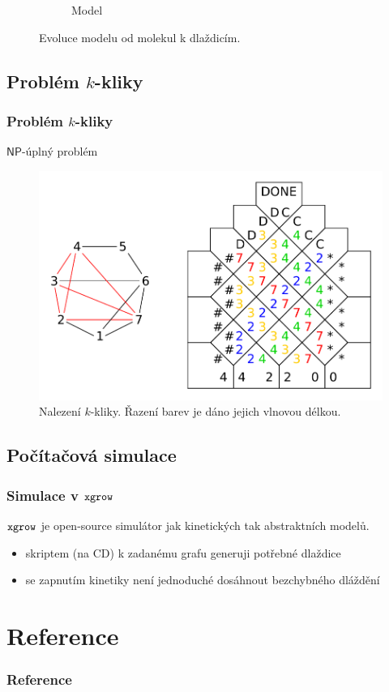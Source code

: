 \documentclass[10pt]{beamer}
\newcommand{\NP}{\mathsf{NP}}
\theoremstyle{definition}
\theoremstyle{remark}
\begin{document}
\begin{frame}
\begin{figure}[H]
\begin{center}
\begin{subfigure}[b]{0.25\textwidth}
			\caption{Model}
		\end{subfigure}
		\caption{Evoluce modelu od molekul k dlaždicím.}
		\label{fig:evolution}
	\end{center}
	\end{figure}
\end{frame}

\subsection{Problém $k$-kliky}
\begin{frame}
\frametitle{Problém $k$-kliky}
	$\NP$-úplný problém
	\begin{figure}[h]
	\begin{center}
		\includegraphics[scale=0.6]{../figures/k-clique/k-clique.pdf}
		\caption{Nalezení $k$-kliky. Řazení barev je dáno jejich vlnovou délkou.}
	\end{center}
	\end{figure}
\end{frame}

\subsection{Počítačová simulace}
\begin{frame}
\frametitle{Simulace v $\tt xgrow$}
	$\tt xgrow$ je open-source simulátor jak kinetických tak abstraktních modelů.
	\begin{itemize}
		\item skriptem (na CD) k zadanému grafu generuji potřebné dlaždice
		\item se zapnutím kinetiky není jednoduché dosáhnout bezchybného dláždění
	\end{itemize}
\end{frame}

\section*{Reference}
\begin{frame}[allowframebreaks=0.95]
\frametitle{Reference}
	{}
	
\end{frame}
\end{document}
